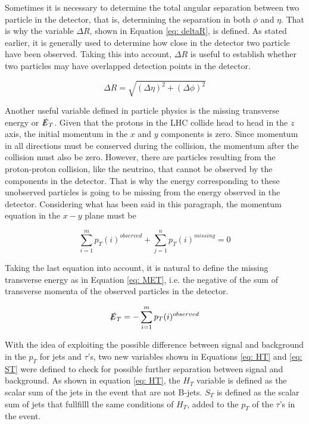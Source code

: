 Sometimes it is necessary to determine the total angular separation between two particle in the detector, that is, determining the separation in both $\phi$ and $\eta$. That is why the variable $\Delta R$, shown in Equation \ref{eq: deltaR}, is defined. As stated earlier, it is generally used to determine how close in the detector two particle have been observed. Taking this into account, $\Delta R$ is useful to establish whether two particles may have overlapped detection points in the detector. 

\begin{equation}\label{eq: deltaR}
\Delta R = \sqrt{\left(\Delta \eta\right)^{2} + \left(\Delta \phi \right)^{2}}
\end{equation}

Another useful variable defined in particle physics is the missing transverse energy or $\slashed{E}_{T}$. Given that the protons in the LHC collide head to head in the $z$ axis, the initial momentum in the $x$ and $y$ components is zero. Since momentum in all directions must be conserved during the collision, the momentum after the collision must also be zero. However, there are particles resulting from the proton-proton collision, like the neutrino, that cannot be observed by the components in the detector. That is why the energy corresponding to these unobserved particles is going to be missing from the energy observed in the detector. Considering what has been said in this paragraph, the momentum equation in the $x-y$ plane must be

$$ \sum_{i=1}^{m} p_{T}(i)^{observed} + \sum_{j=1}^{n} p_{T}(i)^{missing} = 0 $$

Taking the last equation into account, it is natural to define the missing transverse energy as in Equation \ref{eq: MET}, i.e. the negative of the sum of transverse momenta of the observed particles in the detector.

\begin{equation}\label{eq: MET}
\slashed{E}_{T} = -\sum_{i=1}^{m} p_{T}(i)^{observed}
\end{equation}  



With the idea of exploiting the possible difference between signal and background in the $p_{T}$ for jets and $\tau$'s, two new variables shown in Equations \ref{eq: HT} and \ref{eq: ST} were defined to check for possible further separation between signal and background. As shown in equation \ref{eq: HT}, the $H_{T}$ variable is defined as the scalar sum of the jets in the event that are not B-jets. $S_{T}$ is defined as the scalar sum of jets that fullfilll the same conditions of $H_{T}$, added to the $p_{T}$ of the $\tau$'s in the event.


